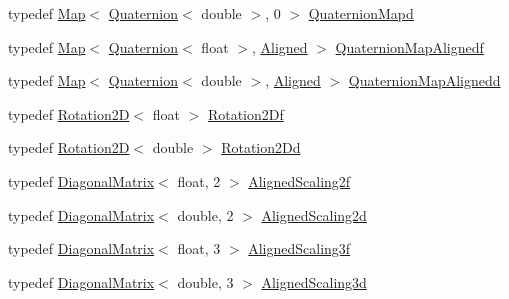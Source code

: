 \begin{DoxyCompactItemize}
\item 
typedef \hyperlink{group___core___module_class_eigen_1_1_map}{Map}$<$ \hyperlink{group___geometry___module_class_eigen_1_1_quaternion}{Quaternion}$<$ double $>$, 0 $>$ \hyperlink{group___geometry___module_gac566b934815fa5293437b5d0c065d4e8}{Quaternion\+Mapd}
\item 
typedef \hyperlink{group___core___module_class_eigen_1_1_map}{Map}$<$ \hyperlink{group___geometry___module_class_eigen_1_1_quaternion}{Quaternion}$<$ float $>$, \hyperlink{group__enums_gga45fe06e29902b7a2773de05ba27b47a1ad37d4c71425bb286e9b4103830538fbf}{Aligned} $>$ \hyperlink{group___geometry___module_ga1224c70c2ecdaeb4bffa4887dbf2d04d}{Quaternion\+Map\+Alignedf}
\item 
typedef \hyperlink{group___core___module_class_eigen_1_1_map}{Map}$<$ \hyperlink{group___geometry___module_class_eigen_1_1_quaternion}{Quaternion}$<$ double $>$, \hyperlink{group__enums_gga45fe06e29902b7a2773de05ba27b47a1ad37d4c71425bb286e9b4103830538fbf}{Aligned} $>$ \hyperlink{group___geometry___module_ga4c11d0bbf7602645581380ba3cd6e690}{Quaternion\+Map\+Alignedd}
\item 
typedef \hyperlink{group___geometry___module_class_eigen_1_1_rotation2_d}{Rotation2D}$<$ float $>$ \hyperlink{group___geometry___module_gad801876e45910d99ebc3f8425e5e2a9e}{Rotation2\+Df}
\item 
typedef \hyperlink{group___geometry___module_class_eigen_1_1_rotation2_d}{Rotation2D}$<$ double $>$ \hyperlink{group___geometry___module_ga610359336130abe9a396ca159b3e8258}{Rotation2\+Dd}
\item 
typedef \hyperlink{group___core___module_class_eigen_1_1_diagonal_matrix}{Diagonal\+Matrix}$<$ float, 2 $>$ \hyperlink{group___geometry___module_ga5acdf901fca83d0f807538414fe0d29e}{Aligned\+Scaling2f}
\item 
typedef \hyperlink{group___core___module_class_eigen_1_1_diagonal_matrix}{Diagonal\+Matrix}$<$ double, 2 $>$ \hyperlink{group___geometry___module_ga028f6f47e59a156fba3bd984363644bd}{Aligned\+Scaling2d}
\item 
typedef \hyperlink{group___core___module_class_eigen_1_1_diagonal_matrix}{Diagonal\+Matrix}$<$ float, 3 $>$ \hyperlink{group___geometry___module_gaf07fc07f3188dad812b24f581985d3d4}{Aligned\+Scaling3f}
\item 
typedef \hyperlink{group___core___module_class_eigen_1_1_diagonal_matrix}{Diagonal\+Matrix}$<$ double, 3 $>$ \hyperlink{group___geometry___module_ga4362757fc0624ef024a7b56b256bfc86}{Aligned\+Scaling3d}

\end{DoxyCompactItemize}
